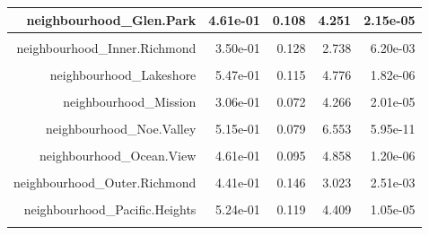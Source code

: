 \documentclass[justified, 11pt]{scrartcl}\usepackage[]{graphicx}\usepackage[]{xcolor}
\newenvironment{knitrout}{}{} %
\begin{document}
\begin{knitrout}
\begin{table}
\begin{tabular}{r|r|r|r|r}
\hline
neighbourhood\_Glen.Park & 4.61e-01 & 0.108 & 4.251 & 2.15e-05\\
\hline
\cellcolor{gray!6}{neighbourhood\_Haight.Ashbury} & \cellcolor{gray!6}{5.43e-01} & \cellcolor{gray!6}{0.099} & \cellcolor{gray!6}{5.464} & \cellcolor{gray!6}{4.77e-08}\\
\hline
neighbourhood\_Inner.Richmond & 3.50e-01 & 0.128 & 2.738 & 6.20e-03\\
\hline
\cellcolor{gray!6}{neighbourhood\_Inner.Sunset} & \cellcolor{gray!6}{4.94e-01} & \cellcolor{gray!6}{0.111} & \cellcolor{gray!6}{4.448} & \cellcolor{gray!6}{8.76e-06}\\
\hline
neighbourhood\_Lakeshore & 5.47e-01 & 0.115 & 4.776 & 1.82e-06\\
\hline
\cellcolor{gray!6}{neighbourhood\_Marina} & \cellcolor{gray!6}{4.38e-01} & \cellcolor{gray!6}{0.127} & \cellcolor{gray!6}{3.442} & \cellcolor{gray!6}{5.80e-04}\\
\hline
neighbourhood\_Mission & 3.06e-01 & 0.072 & 4.266 & 2.01e-05\\
\hline
\cellcolor{gray!6}{neighbourhood\_Nob.Hill} & \cellcolor{gray!6}{4.58e-01} & \cellcolor{gray!6}{0.104} & \cellcolor{gray!6}{4.414} & \cellcolor{gray!6}{1.03e-05}\\
\hline
neighbourhood\_Noe.Valley & 5.15e-01 & 0.079 & 6.553 & 5.95e-11\\
\hline
\cellcolor{gray!6}{neighbourhood\_North.Beach} & \cellcolor{gray!6}{6.16e-01} & \cellcolor{gray!6}{0.118} & \cellcolor{gray!6}{5.213} & \cellcolor{gray!6}{1.90e-07}\\
\hline
neighbourhood\_Ocean.View & 4.61e-01 & 0.095 & 4.858 & 1.20e-06\\
\hline
\cellcolor{gray!6}{neighbourhood\_Outer.Mission} & \cellcolor{gray!6}{2.62e-01} & \cellcolor{gray!6}{0.085} & \cellcolor{gray!6}{3.080} & \cellcolor{gray!6}{2.07e-03}\\
\hline
neighbourhood\_Outer.Richmond & 4.41e-01 & 0.146 & 3.023 & 2.51e-03\\
\hline
\cellcolor{gray!6}{neighbourhood\_Outer.Sunset} & \cellcolor{gray!6}{4.52e-01} & \cellcolor{gray!6}{0.127} & \cellcolor{gray!6}{3.551} & \cellcolor{gray!6}{3.85e-04}\\
\hline
neighbourhood\_Pacific.Heights & 5.24e-01 & 0.119 & 4.409 & 1.05e-05\\
\hline
\cellcolor{gray!6}{neighbourhood\_Parkside} & \cellcolor{gray!6}{4.39e-01} & \cellcolor{gray!6}{0.121} & \cellcolor{gray!6}{3.619} & \cellcolor{gray!6}{2.97e-04}\\

\end{tabular}
\end{table}
\end{knitrout}
\end{document}
